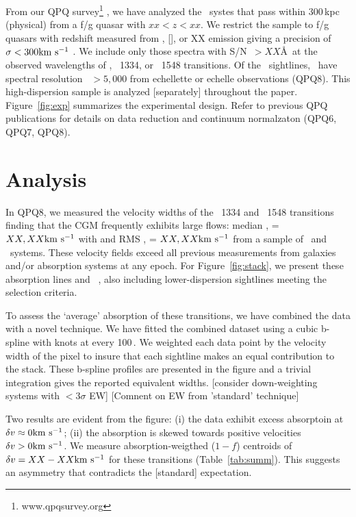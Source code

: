 \documentclass[12pt,preprint]{aastex}
\begin{document}
From our QPQ survey\footnote{www.qpqsurvey.org} \citep{QPQ1},
we have analyzed the \ntot~systes that pass within 300\,kpc
(physical) from a f/g quasar with $xx < z < xx$.
We restrict the sample to f/g quasars with redshift measured
from , [], or XX emission giving 
a precision of $\sigma < 300 {\rm km~s^{-1}}$ \citep{hewittwild}.
We include only those spectra with S/N~$> XX$\AA\ at the
observed wavelengths of \lya, ~1334, or 
~1548 transitions.  Of the \ntot~sightlines, 
\nhigh\ have spectral resolution ~$> 5,000$ from echellette
or echelle observations (QPQ8).  This high-dispersion 
sample is analyzed [separately] throughout the paper.
Figure~\ref{fig:exp} summarizes the experimental design.
Refer to previous QPQ
publications for details on data reduction
and continuum normalzaton (QPQ6, QPQ7, QPQ8).

\section{Analysis}
\label{sec:analysis}

In QPQ8, we measured the velocity widths of the ~1334
and ~1548 transitions finding that the CGM
frequently exhibits large flows:
median , = $XX,XX {\rm km~s^{-1}}$ with and
RMS , = $XX, XX {\rm km~s^{-1}}$ from
a sample of \ncii\ and \nciv\ systems.
These velocity fields exceed all previous measurements from
galaxies and/or absorption systems at any epoch.  For
Figure~\ref{fig:stack}, we present these absorption lines
and ~\lya, also including lower-dispersion 
sightlines meeting the selection criteria.

To assess the `average' absorption of these transitions,
we have combined the data with a novel technique.
We have fitted the combined dataset using a cubic b-spline
with knots at every 100\,\kms.  We weighted each data
point by the velocity width of the pixel to insure that 
each sightline makes an equal contribution to the stack.
These b-spline profiles are presented in the figure
and a trivial integration gives the reported equivalent
widths.
[consider down-weighting systems with $<3\sigma$ EW]
[Comnent on EW from 'standard' technique]

Two results are evident from the figure:
 (i) the data exhibit excess absorptoin at 
 $\delta v \approx 0 {\rm km~s^{-1}}$;
 (ii) the absorption is skewed towards positive velocities
 $\delta v > 0 {\rm km~s^{-1}}$.
We measure absorption-weigthed ($1-f$) centroids
of $\delta v = XX-XX {\rm km~s^{-1}}$ for these transitions
(Table~\ref{tab:summ}).
This suggests an asymmetry that contradicts the [standard]
expectation.  
\end{document}
